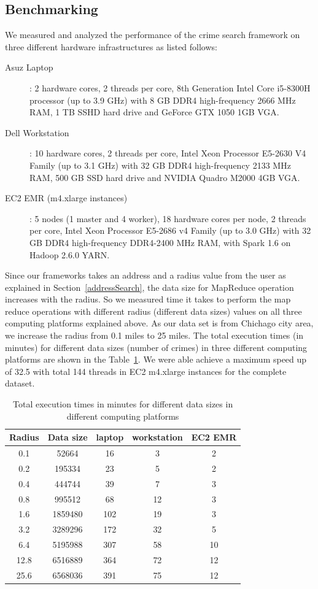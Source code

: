 \subsection{Benchmarking}
We measured and analyzed the performance of the crime search framework
on three different hardware infrastructures as listed follows:
\begin{description}
	\item[Asuz Laptop]: 2 hardware cores, 2 threads per core, 8th
	Generation Intel Core i5-8300H processor (up to 3.9 GHz) with
	8 GB DDR4 high-frequency 2666 MHz RAM, 1 TB SSHD hard drive
	and GeForce GTX 1050 1GB VGA.
        \item[Dell Workstation]: 10
	hardware cores, 2 threads per core, Intel Xeon Processor
	E5-2630 V4 Family (up to 3.1 GHz) with 32 GB DDR4
	high-frequency 2133 MHz RAM, 500 GB SSD hard drive and NVIDIA
	Quadro M2000 4GB VGA.
        \item[EC2 EMR (m4.xlarge instances)]: 5
	nodes (1 master and 4 worker), 18 hardware cores per node, 2
	threads per core, Intel Xeon Processor E5-2686 v4 Family (up
	to 3.0 GHz) with 32 GB DDR4 high-frequency DDR4-2400 MHz RAM,
	with Spark 1.6 on Hadoop 2.6.0 YARN.
\end{description}

Since our frameworks takes an address and a radius value from the user
as explained in Section~\ref{addressSearch}, the data size for
MapReduce operation increases with the radius. So we measured time it
takes to perform the map reduce operations with different radius
(different data sizes) values on all three computing platforms
explained above. As our data set is from Chichago city area, we
increase the radius from 0.1 miles to 25 miles. The total execution
times (in minutes) for different data sizes (number of crimes) in
three different computing platforms are shown in the
Table~\ref{tab:performance}. We were able achieve a maximum speed up
of 32.5 with total 144 threads in EC2 m4.xlarge instances for the
complete dataset.

\begin{table}[]
	\centering
	\caption{Total execution times in minutes for different data sizes in different computing platforms}\label{tab:performance}
	\begin{tabular}{*{5}{c}}
		\toprule
		Radius & Data size &  laptop & workstation &  EC2 EMR \\
		\midrule
		0.1 & 52664  & 16  & 3 &  2 \\
		0.2 & 195334 & 23  & 5 &  2 \\
		0.4 & 444744 & 39  & 7 &  3 \\
		0.8 & 995512 & 68  & 12 &  3 \\
		1.6 & 1859480 & 102  & 19 &  3 \\
		3.2 & 3289296 & 172  & 32 &  5 \\
		6.4 & 5195988 &  307 & 58 &  10 \\
		12.8 & 6516889 & 364  & 72 &  12 \\
		25.6 & 6568036 & 391  & 75 &  12 \\

		\bottomrule
	\end{tabular}
\end{table}

